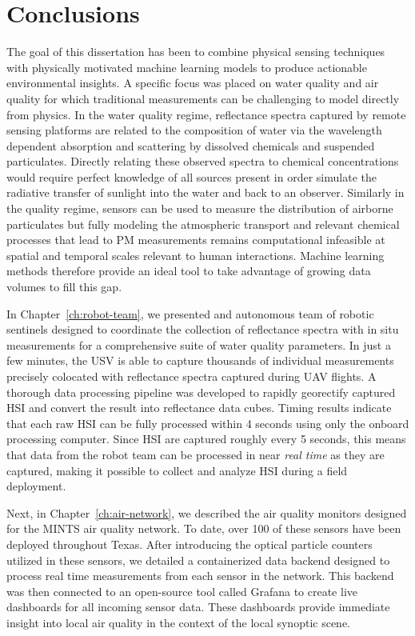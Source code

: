 \chapter{Conclusions}\label{ch:conclusions}

The goal of this dissertation has been to combine physical sensing techniques
with physically motivated machine learning models to produce actionable
environmental insights. A specific focus was placed on water quality and air
quality for which traditional measurements can be challenging to model directly
from physics. In the water quality regime, reflectance spectra captured by
remote sensing platforms are related to the composition of water via the wavelength
dependent absorption and scattering by dissolved chemicals and suspended
particulates. Directly relating these observed spectra to chemical
concentrations would require perfect knowledge of all sources present in order
simulate the radiative transfer of sunlight into the water and back to an
observer. Similarly in the  quality regime, sensors can be used to measure
the distribution of airborne particulates but fully modeling the atmospheric
transport and relevant chemical processes that lead to PM measurements remains
computational infeasible at spatial and temporal scales relevant to human
interactions. Machine learning methods therefore provide an ideal tool to take
advantage of growing data volumes to fill this gap.

In Chapter~\ref{ch:robot-team}, we presented and autonomous team of robotic
sentinels designed to coordinate the collection of reflectance spectra with in
situ measurements for a comprehensive suite of water quality parameters. In just
a few minutes, the USV is able to capture thousands of individual
measurements precisely colocated with reflectance spectra captured during UAV
flights. A thorough data processing pipeline was developed to rapidly georectify
captured HSI and convert the result into reflectance data cubes. Timing
results indicate that each raw HSI can be fully processed within 4 seconds using
only the onboard processing computer. Since HSI are captured roughly every 5
seconds, this means that data from the robot team can be processed in near
\textit{real time} as they are captured, making it possible to collect and
analyze HSI during a field deployment.

Next, in Chapter~\ref{ch:air-network}, we described the air quality monitors
designed for the MINTS air quality network. To date, over 100 of these sensors
have been deployed throughout Texas. After introducing the optical particle
counters utilized in these sensors, we detailed a containerized data backend
designed to process real time measurements from each sensor in the network.
This backend was then connected to an open-source tool called Grafana to create
live dashboards for all incoming sensor data. These dashboards provide immediate
insight into local air quality in the context of the local synoptic scene.

